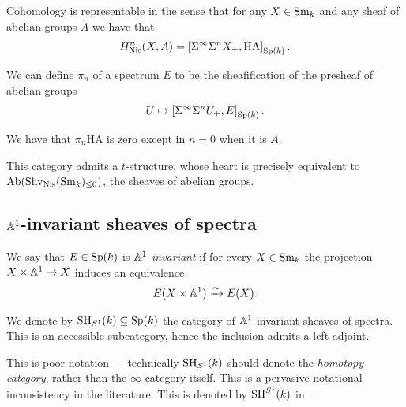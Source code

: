 \documentclass[11pt,openany]{book}
\providecommand{\HA}{\mathrm{HA}}
\begin{document}
\begin{proposition}\label{prop:cohom-representable-in-sheaves-of-spectra} 
Cohomology is representable in the sense that for any $X \in \mathrm{Sm}_k$ and any sheaf of abelian groups $A$ we have that
\begin{align*}
    H^n_\Nis(X,A) = \left[ \Sigma^\infty \Sigma^n X_+, \HA \right]_{\Sp(k)}.
\end{align*}
\end{proposition}


We can define $\pi_n$ of a spectrum $E$ to be the sheafification of the presheaf of abelian groups
\begin{align*}
    U \mapsto \left[ \Sigma^\infty \Sigma^n U_+, E \right]_{\mathrm{Sp}(k)}.
\end{align*}
%

\begin{example} We have that $\pi_n \HA$ is zero except in $n=0$ when it is $A$.
\end{example}

\begin{remark} This category admits a $t$-structure, whose heart is precisely equivalent to $\mathrm{Ab}(\mathrm{Shv}_{\mathrm{Nis}}(\mathrm{Sm}_k)_{\le 0})$, the sheaves of abelian groups.
\end{remark}


\subsection{$\mathbb{A}^1$-invariant sheaves of spectra}

\begin{definition} We say that $E \in \mathrm{Sp}(k)$ is $\mathbb{A}^1$\textit{-invariant} if for every $X \in \mathrm{Sm}_k$ the projection $X \times \mathbb{A}^1 \to X$ induces an equivalence
\begin{align*}
    E(X \times \mathbb{A}^1) \xrightarrow{\sim} E(X).
\end{align*}
\end{definition}

\begin{proposition} We denote by $\mathrm{SH}_{S^1}(k) \subseteq \mathrm{Sp}(k)$ the category of $\mathbb{A}^1$-invariant sheaves of spectra. This is an accessible subcategory, hence the inclusion admits a left adjoint.
\end{proposition}

\begin{remark} This is poor notation --- technically $\mathrm{SH}_{S^1}(k)$ should denote the \textit{homotopy category}, rather than the $\infty$-category itself. This is a pervasive notational inconsistency in the literature. This is denoted by $\mathrm{SH}^{S^1}(k)$ in \cite[3.2.1]{Morel-pi0}.
\end{remark}
\end{document}
